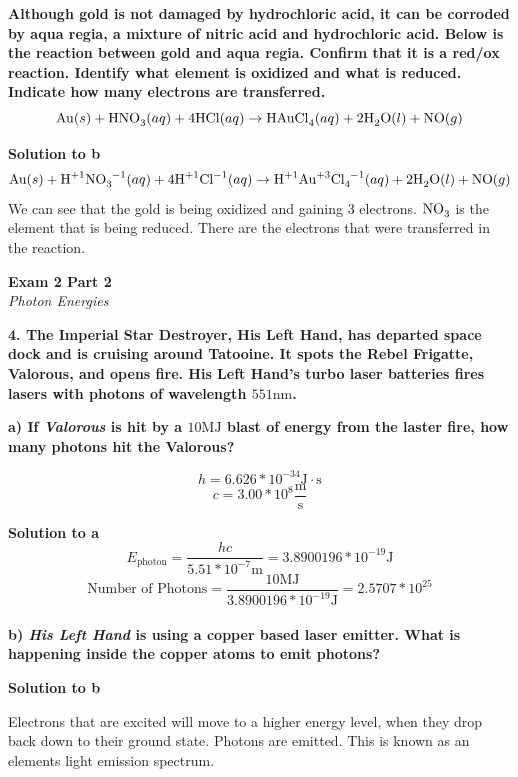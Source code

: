 \documentclass{article}
\begin{document}
    \textbf{Although gold is not damaged by hydrochloric acid, it can be corroded by aqua regia, a mixture of nitric acid and hydrochloric acid. Below is the reaction between gold and aqua regia. Confirm that it is a red/ox reaction. Identify what element is oxidized and what is reduced. Indicate how many electrons are transferred.}
    $$\ce{Au}(s) + \ce{HNO_{3}}(aq) + \ce{4 HCl}(aq) \rightarrow \ce{HAuCl_{4}}(aq) + \ce{2 H2O}(l) + \ce{NO}(g)$$

    \textbf{Solution to b}
    $$\ce{Au}(s) + \ce{H^{+1}NO_{3}^{-1}}(aq) + \ce{4 H^{+1}Cl^{-1}}(aq) \rightarrow \ce{H^{+1}Au^{+3}Cl_{4}^{-1}}(aq) + \ce{2 H2O}(l) + \ce{NO}(g)$$
    We can see that the gold is being oxidized and gaining 3 electrons. $\ce{NO3}$ is the element that is being reduced. There are the electrons that were transferred in the reaction.
    \pagebreak

    \begin{center}
        \textbf{Exam 2 Part 2}\\
        \textit{Photon Energies}
    \end{center}
    \textbf{4. The Imperial Star Destroyer, His Left Hand, has departed space dock and is cruising around Tatooine. It spots the Rebel Frigatte, Valorous, and opens fire. His Left Hand's turbo laser batteries fires lasers with photons of wavelength $551 \si{\nano\meter}$.}

    \textbf{a) If \textit{Valorous} is hit by a $10 \si{\mega\joule}$ blast of energy from the laster fire, how many photons hit the Valorous?}

    $$ h = 6.626 * 10^{-34} \si{\joule} \cdot \si{\second}$$
    $$ c = 3.00 * 10^{8} \frac{\si{\meter}}{\si{\second}} $$

    \textbf{Solution to a}
    $$ E_{\text{photon}} = \dfrac{hc}{5.51 * 10^{-7} \si{\meter}} = 3.8900196 * 10^{-19} \si{\joule} $$
    $$ \text{Number of Photons} = \dfrac{10\si{\mega\joule}}{3.8900196 * 10^{-19} \si{\joule}} = 2.5707 * 10^{25}$$\\[1cm]

    \textbf{b) \textit{His Left Hand} is using a copper based laser emitter. What is happening inside the copper atoms to emit photons?}

    \textbf{Solution to b}

    Electrons that are excited will move to a higher energy level, when they drop back down to their ground state. Photons are emitted. This is known as an elements light emission spectrum.
    \pagebreak
\end{document}
